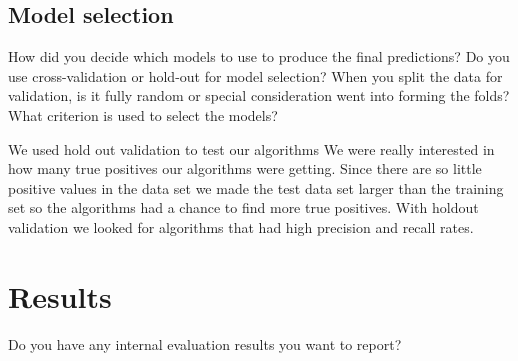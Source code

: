 \documentclass[11pt,a4paper]{article}
\begin{document}
	\subsection{Model selection}
		How did you decide which models to use to produce the final predictions? 
		Do you use cross-validation or hold-out for model selection?
		When you split the data for validation, is it fully random or special consideration went into forming the folds?
		What criterion is used to select the models?

		We used hold out validation to test our algorithms
		We were really interested in how many true positives our algorithms were getting.
		Since there are so little positive values in the data set we made the test data set larger than the training set so the algorithms had a chance to find more true positives.
		With holdout validation we looked for algorithms that had high precision and recall rates.

\section{Results}
	Do you have any internal evaluation results you want to report?
\end{document}
